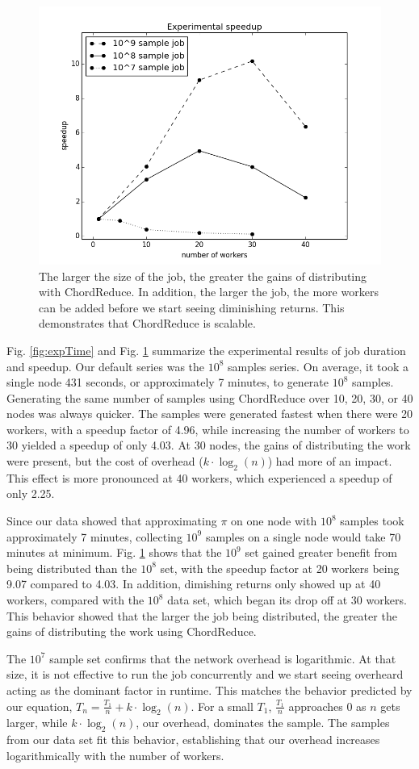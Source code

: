 \begin{figure}
	\centering
	\includegraphics[width=0.5\linewidth]{figs/expSpeed}
	\caption{The larger the size of the job, the greater the gains of distributing with ChordReduce.  In addition, the larger the job, the more workers can be added before we start seeing diminishing returns.  This demonstrates that ChordReduce is scalable.}
	\label{fig:expSpeed}
\end{figure}

Fig. \ref{fig:expTime} and Fig. \ref{fig:expSpeed} summarize the experimental results of job duration and speedup.  
Our default series was the $10^{8}$ samples series.  
On average, it took a single node 431 seconds, or approximately 7 minutes, to generate $10^{8}$ samples.  
Generating the same number of samples using ChordReduce over 10, 20, 30, or 40 nodes was always quicker.  
The samples were generated fastest when there were 20 workers, with a speedup factor of 4.96, while increasing the number of workers to 30 yielded a speedup of only 4.03.  
At 30 nodes, the gains of distributing the work were present, but the cost of overhead ($k \cdot \log_{2}(n)$) had more of an impact.  
This effect is more pronounced at 40 workers, which experienced  a speedup of only 2.25.

Since our data showed that approximating $\pi$ on one node with $10^{8}$ samples took approximately 7 minutes, collecting $10^{9}$ samples on a single node would take 70 minutes at minimum.  
Fig. \ref{fig:expSpeed} shows that the $10^{9}$ set gained greater benefit from being distributed than the $10^{8}$ set, with the speedup factor at 20 workers being 9.07 compared to 4.03.  
In addition, dimishing returns only showed up at 40 workers, compared with the $10^{8}$ data set, which began its drop off at 30 workers.
This behavior showed that the larger the job being distributed, the greater the gains of distributing the work using ChordReduce.

The $10^{7}$ sample set confirms that the network overhead is logarithmic.  
At that size, it is not effective to run the job concurrently and we start seeing overheard acting as the dominant factor in runtime.  
This matches the behavior predicted by our equation, $T_{n} = \frac{T_{1}}{n} + k \cdot \log_{2}(n)$. 
For a small $T_{1}$, $\frac{T_{1}}{n}$  approaches 0 as $n$ gets larger, while $k \cdot \log_{2}(n)$, our overhead, dominates the sample.  
The samples from our data set fit this behavior, establishing that our overhead increases logarithmically with the number of workers.


